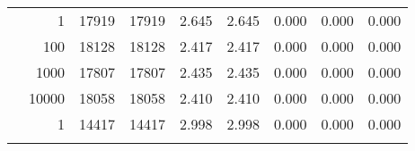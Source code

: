 \begin{table}
\begin{tabular}{rrrrrrrrr}
	            
	        
				\noalign{\smallskip}\hline
				\multirow{ 4 }{*}{ 80000 } &
				
					
					 
					\multirow{ 1 }{*}{ 1 } &
					
						
							    
							     17919  & 17919  
	                           & 2.645 & 2.645 & 0.000
	                           & 0.000 & 0.000  \\
	                
	            
					 &  
					 
					\multirow{ 1 }{*}{ 100 } &
					
						
							    
							     18128  & 18128  
	                           & 2.417 & 2.417 & 0.000
	                           & 0.000 & 0.000  \\
	                
	            
					 &  
					 
					\multirow{ 1 }{*}{ 1000 } &
					
						
							    
							     17807  & 17807  
	                           & 2.435 & 2.435 & 0.000
	                           & 0.000 & 0.000  \\
	                
	            
					 &  
					 
					\multirow{ 1 }{*}{ 10000 } &
					
						
							    
							     18058  & 18058  
	                           & 2.410 & 2.410 & 0.000
	                           & 0.000 & 0.000  \\
	                
	            
	        
				\noalign{\smallskip}\hline
				\multirow{ 4 }{*}{ 160000 } &
				
					
					 
					\multirow{ 1 }{*}{ 1 } &
					
						
							    
							     14417  & 14417  
	                           & 2.998 & 2.998 & 0.000
	                           & 0.000 & 0.000  \\
	                
	            
					 &  
					 

\end{tabular}
\end{table}
